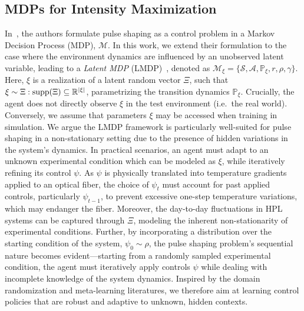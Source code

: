 \subsection{MDPs for Intensity Maximization}\label{sec:mdp}
In~\cite{capuano2023temporl}, the authors formulate pulse shaping as a control problem in a Markov Decision Process (MDP), \( \mathcal{M} \). In this work, we extend their formulation to the case where the environment dynamics are influenced by an unobserved latent variable, leading to a \textit{Latent MDP} (LMDP)~\citep{chen2021understanding}, denoted as \(\mathcal{M}_\xi = \{\mathcal{S}, \mathcal{A}, \mathbb{P}_\xi, r, \rho, \gamma\}\). Here, \( \xi \) is a realization of a latent random vector \( \Xi \), such that \(\xi \sim \Xi : \operatorname{supp}(\Xi) \subseteq \mathbb{R}^{|\xi|}\), parametrizing the transition dynamics \( \mathbb{P}_\xi \). Crucially, the agent does not directly observe \( \xi \) in the test environment (i.e.~the real world).
Conversely, we assume that parameters \( \xi \) may be accessed when training in simulation.
We argue the LMDP framework is particularly well-suited for pulse shaping in a non-stationary setting due to the presence of hidden variations in the system's dynamics. In practical scenarios, an agent must adapt to an unknown experimental condition which can be modeled as \( \xi \), while iteratively refining its control \( \psi \). As \( \psi \) is physically translated into temperature gradients applied to an optical fiber, the choice of \( \psi_t \) must account for past applied controls, particularly \( \psi_{t-1} \), to prevent excessive one-step temperature variations, which may endanger the fiber. Moreover, the day-to-day fluctuations in HPL systems can be captured through \( \Xi\), modeling the inherent non-stationarity of experimental conditions. Further, by incorporating a distribution over the starting condition of the system, \( \psi_0 \sim \rho \), the pulse shaping problem's sequential nature becomes evident---starting from a randomly sampled experimental condition, the agent must iteratively apply controls \(\psi\) while dealing with incomplete knowledge of the system dynamics.
Inspired by the domain randomization and meta-learning literatures, we therefore aim at learning control policies that are robust and adaptive to unknown, hidden contexts.

